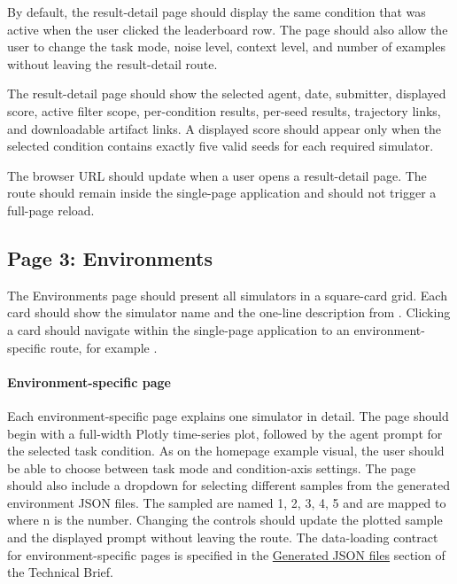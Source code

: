 \documentclass[11pt]{article}
\begin{document}
By default, the result-detail page should display the same condition that was active when the user clicked the leaderboard row.
The page should also allow the user to change the task mode, noise level, context level, and number of examples without leaving the result-detail route.

The result-detail page should show the selected agent, date, submitter, displayed score, active filter scope, per-condition results, per-seed results, trajectory links, and downloadable artifact links. 
A displayed score should appear only when the selected condition contains exactly five valid seeds for each required simulator.


The browser URL should update when a user opens a result-detail page.
The route should remain inside the single-page application and should not trigger a full-page reload.


\label{sec:website-page-environments}

\subsection*{Page 3: Environments}
The Environments page should present all simulators in a square-card grid. 
Each card should show the simulator name and the one-line description from . 
Clicking a card should navigate within the single-page application to an environment-specific route, for example .

\label{sec:website-environment-specific-page}
\paragraph{Environment-specific page}
Each environment-specific page explains one simulator in detail. 
The page should begin with a full-width Plotly time-series plot, followed by the agent prompt for the selected task condition. 
As on the homepage example visual, the user should be able to choose between task mode and condition-axis settings. 
The page should also include a dropdown for selecting different samples from the generated environment JSON files. 
The sampled are named 1, 2, 3, 4, 5 and are mapped to  where n is the number.
Changing the controls should update the plotted sample and the displayed prompt without leaving the route.
The data-loading contract for environment-specific pages is specified in the \hyperref[sec:website-generated-json]{Generated JSON files} section of the Technical Brief.
\end{document}
